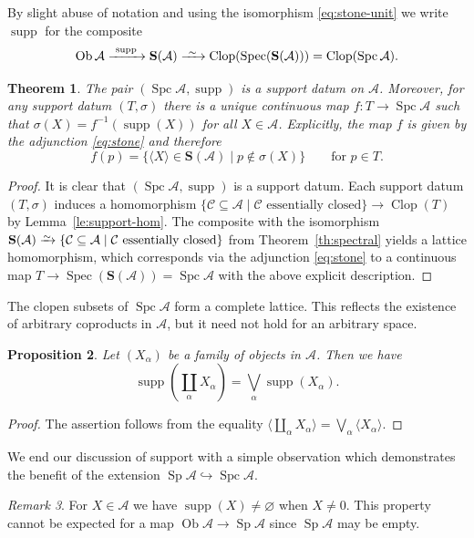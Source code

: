 \documentclass[a4paper]{amsart}
\theoremstyle{plain}
\newtheorem{thm}{Theorem}[section]
\newtheorem{prop}[thm]{Proposition}
\theoremstyle{definition}
\theoremstyle{remark}
\newtheorem{rem}[thm]{Remark}
\numberwithin{equation}{section}
\newcommand{\Clop}{\operatorname{Clop}}
\newcommand{\Ob}{\operatorname{Ob}}
\newcommand{\Sp}{\operatorname{Sp}}
\newcommand{\Spc}{\operatorname{Spc}}
\newcommand{\Spec}{\operatorname{Spec}}
\newcommand{\supp}{\operatorname{supp}}
\newcommand{\iso}{\xrightarrow{\raisebox{-.4ex}[0ex][0ex]{$\scriptstyle{\sim}$}}}
\newcommand{\longiso}{\xrightarrow{\ \raisebox{-.4ex}[0ex][0ex]{$\scriptstyle{\sim}$}\ }}
\newcommand{\xto}{\xrightarrow}
\def\A{\mathcal A}
\def\C{\mathcal C}
\def\bfS{\mathbf S}
\def\a{\alpha}
\def\s{\sigma}
\begin{document}
By slight abuse of notation and using the isomorphism
\eqref{eq:stone-unit} we write $\supp$ for the composite
\[\Ob\A\xto{\ \supp\ }\bfS(\A)\longiso\Clop(\Spec(\bfS(\A)))=\Clop(\Spc\A).\]

\begin{thm}\label{th:support}
  The pair $(\Spc\A,\supp)$ is a support datum on $\A$. Moreover,
  for any support datum $(T,\s)$ there is a unique continuous map
  $f\colon T\to\Spc\A$ such that $\s(X)=f^{-1}(\supp(X))$ for all
  $X\in\A$. Explicitly, the map $f$ is given by the adjunction
  \eqref{eq:stone} and therefore
  \[f(p)=\{\langle X\rangle\in\bfS(\A)\mid p\not\in\s(X)\}\qquad\text{for
    }p\in T.\] 
\end{thm}

\begin{proof}
  It is clear that $(\Spc\A,\supp)$ is a support datum. Each support
  datum $(T,\s)$ induces a homomorphism
  $\{\C\subseteq\A\mid \C\text{ essentially closed}\}\to\Clop(T)$ by
  Lemma~\ref{le:support-hom}. The composite with the isomorphism
  $\bfS(\A)\iso\{\C\subseteq\A\mid \C\text{ essentially closed}\}$ from
  Theorem~\ref{th:spectral} yields a lattice homomorphism,
  which corresponds via the adjunction \eqref{eq:stone} to a
  continuous map $ T\to\Spec(\bfS(\A))=\Spc\A$ with the above
  explicit description.
\end{proof}

The clopen subsets of $\Spc\A$ form a complete lattice. This reflects
the existence of arbitrary coproducts in $\A$, but it need not hold
for an arbitrary space.

\begin{prop}
 Let $(X_\a)$ be a family of objects in $\A$. Then we have
 \[\supp\left(\coprod_\a X_\a\right)= \bigvee_\a\supp(X_\a).\]
\end{prop}

\begin{proof}
  The assertion follows from the equality
  $\langle\coprod_\a X_\a\rangle=\bigvee_\a\langle X_\a\rangle$.
\end{proof}

We end our discussion of support with a simple observation which
demonstrates the benefit of the extension $\Sp\A\hookrightarrow\Spc\A$.

\begin{rem}
For $X\in\A$ we have $\supp(X)\neq\varnothing$ when $X\neq 0$. This
property 
cannot be expected for a map $\Ob\A\to\Sp\A$ since $\Sp\A$ may be empty.
\end{rem}
\end{document}
